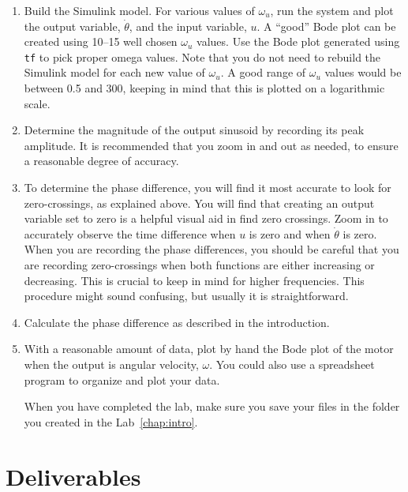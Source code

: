 \begin{enumerate}
    \item Build the \textsf{Simulink} model.  For various values of \(\omega_u\), run
          the system and plot the output variable, \(\dot\theta \), and the input
          variable, \(u\).  A ``good'' Bode plot can be created using 10--15 well
          chosen \(\omega_u\) values.  Use the Bode plot generated using \verb|tf| to pick
          proper omega values. Note that you do not need to rebuild the \textsf{Simulink}
          model for each new value of \(\omega_u\). A good range of \(\omega_u\) values would
          be between 0.5 and 300, keeping in mind that this is plotted on a logarithmic scale.

    \item Determine the magnitude of the output sinusoid by recording its peak
          amplitude.  It is recommended that you zoom in and out as needed, to ensure a
          reasonable degree of accuracy.

    \item To determine the phase difference, you will find it most accurate to
          look for zero-crossings, as explained above.  You will find that creating an
          output variable set to zero is a helpful visual aid in find zero crossings.
          Zoom in to accurately observe the time difference when \(u\) is zero and when
          \(\dot\theta \) is zero.  When you are recording the phase differences, you
          should be careful that you are recording zero-crossings when both functions are either
          increasing or decreasing. This is crucial to keep in mind for higher frequencies.
          This procedure might sound confusing, but usually it is straightforward.

    \item Calculate the phase difference as described in the introduction.

    \item With a reasonable amount of data, plot by hand the Bode plot of the
          motor when the output is angular velocity, \(\omega \). You could also use a
          spreadsheet program to organize and plot your data.

          When you have completed the lab, make sure you save your files in the folder
          you created in the Lab~\ref{chap:intro}.
\end{enumerate}

\section{Deliverables}

